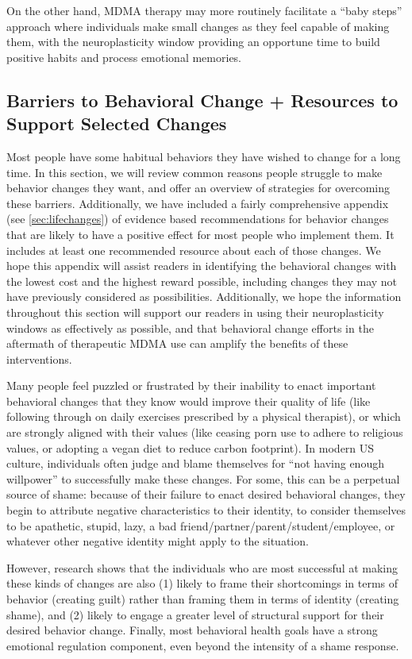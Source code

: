 \documentclass[12pt,letterpaper]{book}
\begin{document}
On the other hand, MDMA therapy may more routinely facilitate a “baby steps” approach where individuals make small changes as they feel capable of making them, with the neuroplasticity window providing an opportune time to build positive habits and process emotional memories.

\subsection*{Barriers to Behavioral Change + Resources to Support Selected Changes}

Most people have some habitual behaviors they have wished to change for a long time. In this section, we will review common reasons people struggle to make behavior changes they want, and offer an overview of strategies for overcoming these barriers. Additionally, we have included a fairly comprehensive appendix (see \ref{sec:lifechanges}) of evidence based recommendations for behavior changes that are likely to have a positive effect for most people who implement them. It includes at least one recommended resource about each of those changes. We hope this appendix will assist readers in identifying the behavioral changes with the lowest cost and the highest reward possible, including changes they may not have previously considered as possibilities. Additionally, we hope the information throughout this section will support our readers in using their neuroplasticity windows as effectively as possible, and that behavioral change efforts in the aftermath of therapeutic MDMA use can amplify the benefits of these interventions.

Many people feel puzzled or frustrated by their inability to enact important behavioral changes that they know would improve their quality of life (like following through on daily exercises prescribed by a physical therapist), or which are strongly aligned with their values (like ceasing porn use to adhere to religious values, or adopting a vegan diet to reduce carbon footprint). In modern US culture, individuals often judge and blame themselves for “not having enough willpower” to successfully make these changes. For some, this can be a perpetual source of shame: because of their failure to enact desired behavioral changes, they begin to attribute negative characteristics to their identity, to consider themselves to be apathetic, stupid, lazy, a bad friend/partner/parent/student/employee, or whatever other negative identity might apply to the situation.

However, research shows that the individuals who are most successful at making these kinds of changes are also (1) likely to frame their shortcomings in terms of behavior (creating guilt) rather than framing them in terms of identity (creating shame), and (2) likely to engage a greater level of structural support for their desired behavior change. Finally, most behavioral health goals have a strong emotional regulation component, even beyond the intensity of a shame response.
\end{document}
